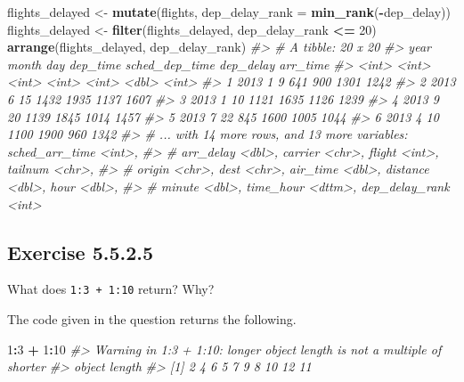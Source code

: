 \documentclass[]{book}
\newenvironment{Shaded}{\begin{snugshade}}{\end{snugshade}}
\newcommand{\CommentTok}[1]{\textcolor[rgb]{0.56,0.35,0.01}{\textit{#1}}}
\newcommand{\DataTypeTok}[1]{\textcolor[rgb]{0.13,0.29,0.53}{#1}}
\newcommand{\DecValTok}[1]{\textcolor[rgb]{0.00,0.00,0.81}{#1}}
\newcommand{\KeywordTok}[1]{\textcolor[rgb]{0.13,0.29,0.53}{\textbf{#1}}}
\newcommand{\NormalTok}[1]{#1}
\newcommand{\OperatorTok}[1]{\textcolor[rgb]{0.81,0.36,0.00}{\textbf{#1}}}
\newcommand{\StringTok}[1]{\textcolor[rgb]{0.31,0.60,0.02}{#1}}
\theoremstyle{plain}
\theoremstyle{remark}
\begin{document}
\begin{Shaded}
\begin{Highlighting}[]
\NormalTok{flights_delayed <-}\StringTok{ }\KeywordTok{mutate}\NormalTok{(flights, }\DataTypeTok{dep_delay_rank =} \KeywordTok{min_rank}\NormalTok{(}\OperatorTok{-}\NormalTok{dep_delay))}
\NormalTok{flights_delayed <-}\StringTok{ }\KeywordTok{filter}\NormalTok{(flights_delayed, dep_delay_rank }\OperatorTok{<=}\StringTok{ }\DecValTok{20}\NormalTok{)}
\KeywordTok{arrange}\NormalTok{(flights_delayed, dep_delay_rank)}
\CommentTok{#> # A tibble: 20 x 20}
\CommentTok{#>    year month   day dep_time sched_dep_time dep_delay arr_time}
\CommentTok{#>   <int> <int> <int>    <int>          <int>     <dbl>    <int>}
\CommentTok{#> 1  2013     1     9      641            900      1301     1242}
\CommentTok{#> 2  2013     6    15     1432           1935      1137     1607}
\CommentTok{#> 3  2013     1    10     1121           1635      1126     1239}
\CommentTok{#> 4  2013     9    20     1139           1845      1014     1457}
\CommentTok{#> 5  2013     7    22      845           1600      1005     1044}
\CommentTok{#> 6  2013     4    10     1100           1900       960     1342}
\CommentTok{#> # ... with 14 more rows, and 13 more variables: sched_arr_time <int>,}
\CommentTok{#> #   arr_delay <dbl>, carrier <chr>, flight <int>, tailnum <chr>,}
\CommentTok{#> #   origin <chr>, dest <chr>, air_time <dbl>, distance <dbl>, hour <dbl>,}
\CommentTok{#> #   minute <dbl>, time_hour <dttm>, dep_delay_rank <int>}
\end{Highlighting}
\end{Shaded}

\hypertarget{exercise-5.5.2.5}{%
\subsection*{\texorpdfstring{Exercise {5.5.2.5}}{Exercise 5.5.2.5}}\label{exercise-5.5.2.5}}

What does \texttt{1:3\ +\ 1:10} return? Why?

The code given in the question returns the following.

\begin{Shaded}
\begin{Highlighting}[]
\DecValTok{1}\OperatorTok{:}\DecValTok{3} \OperatorTok{+}\StringTok{ }\DecValTok{1}\OperatorTok{:}\DecValTok{10}
\CommentTok{#> Warning in 1:3 + 1:10: longer object length is not a multiple of shorter}
\CommentTok{#> object length}
\CommentTok{#>  [1]  2  4  6  5  7  9  8 10 12 11}
\end{Highlighting}
\end{Shaded}
\end{document}
